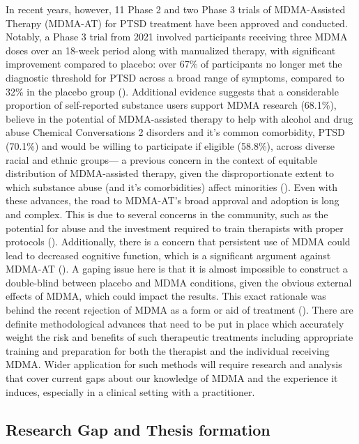 \documentclass[
  man,
  longtable,
  nolmodern,
  notxfonts,
  notimes,
  colorlinks=true,linkcolor=blue,citecolor=blue,urlcolor=blue]{apa7}
\begin{document}
In recent years, however, 11 Phase 2 and two Phase 3 trials of
MDMA-Assisted Therapy (MDMA-AT) for PTSD treatment have been approved
and conducted. Notably, a Phase 3 trial from 2021 involved participants
receiving three MDMA doses over an 18-week period along with manualized
therapy, with significant improvement compared to placebo: over 67\% of
participants no longer met the diagnostic threshold for PTSD across a
broad range of symptoms, compared to 32\% in the placebo group
().
Additional evidence suggests that a considerable proportion of
self-reported substance users support MDMA research (68.1\%), believe in
the potential of MDMA-assisted therapy to help with alcohol and drug
abuse Chemical Conversations 2 disorders and it's common comorbidity,
PTSD (70.1\%) and would be willing to participate if eligible (58.8\%),
across diverse racial and ethnic groups--- a previous concern in the
context of equitable distribution of MDMA-assisted therapy, given the
disproportionate extent to which substance abuse (and it's
comorbidities) affect minorities
(). Even with these
advances, the road to MDMA-AT's broad approval and adoption is long and
complex. This is due to several concerns in the community, such as the
potential for abuse and the investment required to train therapists with
proper protocols (). Additionally, there is a concern that persistent use of
MDMA could lead to decreased cognitive function, which is a significant
argument against MDMA-AT (). A gaping issue here is that it is almost impossible to
construct a double-blind between placebo and MDMA conditions, given the
obvious external effects of MDMA, which could impact the results. This
exact rationale was behind the recent rejection of MDMA as a form or aid
of treatment (). There are definite methodological advances that need to be put
in place which accurately weight the risk and benefits of such
therapeutic treatments including appropriate training and preparation
for both the therapist and the individual receiving MDMA. Wider
application for such methods will require research and analysis that
cover current gaps about our knowledge of MDMA and the experience it
induces, especially in a clinical setting with a practitioner.

\subsection{Research Gap and Thesis
formation}\label{research-gap-and-thesis-formation}
\end{document}
